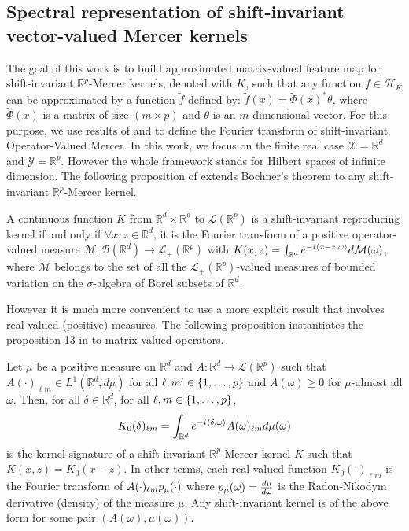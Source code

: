 \documentclass[twocolumn]{article}
\begin{document}
\subsection{Spectral representation of shift-invariant vector-valued Mercer
kernels}
The goal of this work is to build approximated matrix-valued feature map for
shift-invariant $\mathbb{R}^p$-Mercer kernels, denoted with $K$, such that any
function $f \in \mathcal{H}_K$ can be approximated by a function $\tilde{f}$
defined by: $ \tilde{f}(x) = \tilde{\Phi}(x)^* \theta$, where $\tilde{\Phi}(x)$
is a matrix of size $(m \times p)$ and $\theta$ is an $m$-dimensional vector.
For this purpose, we use results of \cite{Carmeli2010} and \cite{Zhang2012}
to define the Fourier transform of shift-invariant Operator-Valued Mercer. In
this work, we focus on the finite real case $\mathcal{X} = \mathbb{R}^d$ and
$\mathcal{Y} = \mathbb{R}^p$. However the whole framework stands for Hilbert
spaces of infinite dimension.  The following proposition of \cite{Zhang2012}
extends Bochner's theorem to any shift-invariant $\mathbb{R}^p$-Mercer kernel.
\begin{proposition}
    A continuous function $K$ from $\mathbb{R}^d \times \mathbb{R}^d$ to
    $\mathcal{L}(\mathbb{R}^p)$ is a shift-invariant reproducing kernel if and
    only if $\forall x, z \in \mathbb{R}^d$, it is the Fourier transform of a
    positive operator-valued measure $\mathcal{M}: \mathcal{B}(\mathbb{R}^d)
    \to \mathcal{L}_+(\mathbb{R}^p)$ with $K(x, z) = \int_{\mathbb{R}^d} e^{-i
    \langle x - z, \omega\rangle} d\mathcal{M}(\omega)$, where $\mathcal{M}$ belongs
    to the set of all the $\mathcal{L}_+(\mathbb{R}^p)$-valued measures of
    bounded variation on the $\sigma$-algebra of Borel subsets of
    $\mathbb{R}^d$.
\end{proposition}
However it is much more convenient to use a more explicit result that involves
real-valued (positive) measures. The following proposition instantiates the
proposition 13 in \cite{Carmeli2010} to matrix-valued operators.
\begin{proposition}
    \label{pr:bochner}
    Let $\mu$ be a positive measure on $\mathbb{R}^d$ and $A: \mathbb{R}^d\to
    \mathcal{L}(\mathbb{R}^p)$ such that $A(\cdot)_{\ell m}\in
    L^1(\mathbb{R}^d,d\mu)$ for all $\ell, m'\in {\left\{1, \ldots, p\right\}}$ and
    $A(\omega)\ge0$ for $\mu$-almost all $\omega$. Then, for all $\delta \in
    \mathbb{R}^d$, for all $\ell,m \in {\left\{1, \ldots, p\right\}}$,
    \begin{equation}
        \label{eq:AK0}
        K_0(\delta)_{\ell
        m}=\int_{\mathbb{R}^d}e^{-i\langle\delta,\omega\rangle}A(\omega)_{\ell
        m}d\mu(\omega)
    \end{equation}
    is the kernel signature of a shift-invariant $\mathbb{R}^p$-Mercer kernel
    $K$ such that $K(x,z)=K_0(x-z)$. In other terms, each real-valued function
    $K_0(\cdot)_{\ell m}$ is the Fourier transform of $A(\cdot)_{\ell
    m}p_{\mu}(\cdot)$ where $p_{\mu}(\omega)=\frac{d\mu}{d\omega}$ is the
    Radon-Nikodym derivative (density) of the measure $\mu$. Any
    shift-invariant kernel is of the above form for some pair $(A(\omega),\mu
    (\omega))$.
\end{proposition}
\end{document}
